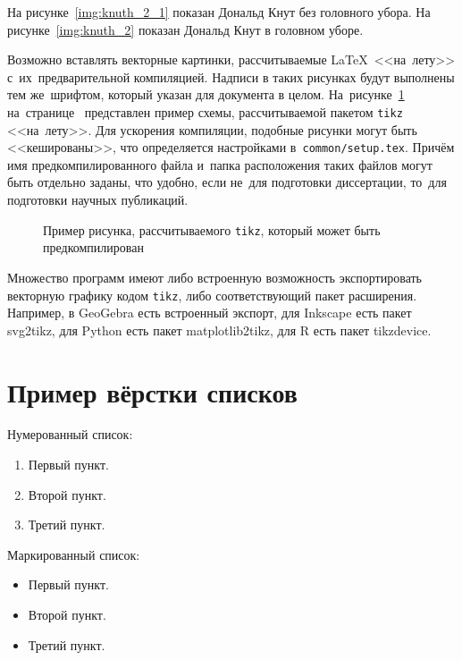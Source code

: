 На рисунке~\ref{img:knuth_2_1} показан Дональд Кнут без головного убора.
На рисунке~\ref{img:knuth_2}
показан Дональд Кнут в головном уборе.

Возможно вставлять векторные картинки, рассчитываемые \LaTeX\ <<на~лету>>
с~их~предварительной компиляцией. Надписи в таких рисунках будут выполнены
тем же~шрифтом, который указан для документа в целом.
На~рисунке~\ref{img:tikz_example} на~странице~\pageref{img:tikz_example}
представлен пример схемы, рассчитываемой пакетом \verb|tikz| <<на~лету>>.
Для ускорения компиляции, подобные рисунки могут быть <<кешированы>>, что
определяется настройками в~\verb|common/setup.tex|.
Причём имя предкомпилированного
файла и~папка расположения таких файлов могут быть отдельно заданы,
что удобно, если не~для подготовки диссертации,
то~для подготовки научных публикаций.
\begin{figure}[ht]
    {\centering
        

    }
    \legend{}
    \caption[Пример \texttt{tikz} схемы]{Пример рисунка, рассчитываемого
        \texttt{tikz}, который может быть предкомпилирован}
    \label{img:tikz_example}
\end{figure}

Множество программ имеют либо встроенную возможность экспортировать векторную
графику кодом \verb|tikz|, либо соответствующий пакет расширения.
Например, в GeoGebra есть встроенный экспорт,
для Inkscape есть пакет svg2tikz,
для Python есть пакет matplotlib2tikz,
для R есть пакет tikzdevice.

\section{Пример вёрстки списков} \label{sect2_3}

\noindent Нумерованный список:
\begin{enumerate}
  \item Первый пункт.
  \item Второй пункт.
  \item Третий пункт.
\end{enumerate}

\noindent Маркированный список:
\begin{itemize}
  \item Первый пункт.
  \item Второй пункт.
  \item Третий пункт.
\end{itemize}

